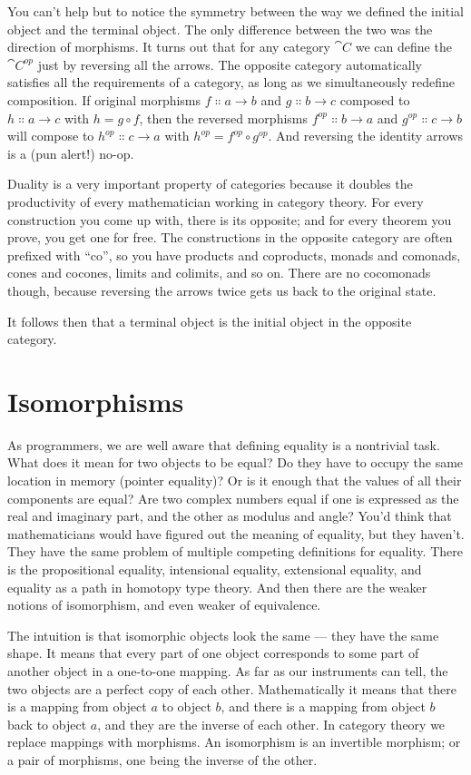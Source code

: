 You can't help but to notice the symmetry between the way we defined the
initial object and the terminal object. The only difference between the
two was the direction of morphisms. It turns out that for any category $\cat{C}$
we can define the  $\cat{C}^{op}$ just by
reversing all the arrows. The opposite category automatically satisfies
all the requirements of a category, as long as we simultaneously
redefine composition. If original morphisms
$f \Colon a \to b$ and $g \Colon b \to c$ composed
to $h \Colon a \to c$ with $h = g \circ f$, then the reversed
morphisms $f^{op} \Colon b \to a$ and $g^{op} \Colon c \to b$ will compose to
$h^{op} \Colon c \to a$ with $h^{op} = f^{op} \circ g^{op}$. And reversing
the identity arrows is a (pun alert!) no-op.

Duality is a very important property of categories because it doubles
the productivity of every mathematician working in category theory. For
every construction you come up with, there is its opposite; and for
every theorem you prove, you get one for free. The constructions in the
opposite category are often prefixed with ``co'', so you have products
and coproducts, monads and comonads, cones and cocones, limits and
colimits, and so on. There are no cocomonads though, because reversing
the arrows twice gets us back to the original state.

It follows then that a terminal object is the initial object in the
opposite category.

\section{Isomorphisms}

As programmers, we are well aware that defining equality is a nontrivial
task. What does it mean for two objects to be equal? Do they have to
occupy the same location in memory (pointer equality)? Or is it enough
that the values of all their components are equal? Are two complex
numbers equal if one is expressed as the real and imaginary part, and
the other as modulus and angle? You'd think that mathematicians would
have figured out the meaning of equality, but they haven't. They have
the same problem of multiple competing definitions for equality. There
is the propositional equality, intensional equality, extensional
equality, and equality as a path in homotopy type theory. And then there
are the weaker notions of isomorphism, and even weaker of equivalence.

The intuition is that isomorphic objects look the same --- they have the
same shape. It means that every part of one object corresponds to some
part of another object in a one-to-one mapping. As far as our
instruments can tell, the two objects are a perfect copy of each other.
Mathematically it means that there is a mapping from object $a$ to
object $b$, and there is a mapping from object $b$ back to
object $a$, and they are the inverse of each other. In category
theory we replace mappings with morphisms. An isomorphism is an
invertible morphism; or a pair of morphisms, one being the inverse of
the other.

